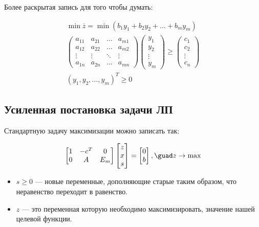 \documentclass[a4paper,article,14pt]{extarticle}
\begin{document}
Более раскрытая запись для того чтобы думать:

\begin{gather}
    \min \overline z = \min (b_1y_1 + b_2y_2 + \ldots + b_my_m) \\
    \begin{pmatrix}
        a_{11} & a_{21} & \ldots & a_{m1} \\
        a_{12} & a_{22} & \ldots & a_{m2} \\
        \vdots & \vdots & \ddots & \vdots \\
        a_{1n} & a_{2n} & \ldots & a_{mn}
    \end{pmatrix}
    \begin{pmatrix}
        y_1 \\ y_2 \\ \vdots \\ y_m
    \end{pmatrix}
    \ge
    \begin{pmatrix}
        c_1 \\ c_2 \\ \vdots \\ c_n
    \end{pmatrix}
    \\
    (y_1, y_2, \ldots, y_m)^T \ge 0
\end{gather}


\subsection{Усиленная постановка задачи ЛП}

Стандартную задачу максимизации можно записать так:

\begin{equation}
    \begin{bmatrix}
        1 & -c^T & 0 \\
        0 & A & E_m
    \end{bmatrix}
    \begin{bmatrix}
        z \\ x \\ s
    \end{bmatrix}
    =
    \begin{bmatrix}
        0 \\ b
    \end{bmatrix}
    , \guad
    z \rightarrow \max
\end{equation}

\begin{itemize}
    \item \(s \ge 0\) --- новые переменные, дополняющие старые таким образом, что неравенство переходит в равенство.
    \item \(z\) --- это переменная которую необходимо максимизировать, значение нашей целевой функции.
\end{itemize}
\end{document}
